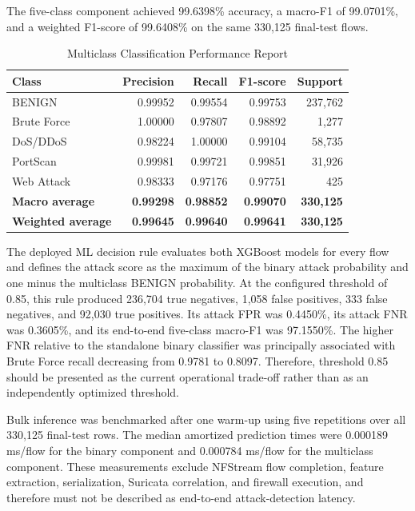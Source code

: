 The five-class component achieved 99.6398\% accuracy, a macro-F1 of
99.0701\%, and a weighted F1-score of 99.6408\% on the same 330,125
final-test flows.

\begin{table}[H]
  \caption{Multiclass Classification Performance Report}
  \centering
  \small
  \begin{tabularx}{\textwidth}{|X|r|r|r|r|}
    \hline
    \textbf{Class} & \textbf{Precision} & \textbf{Recall} & \textbf{F1-score} & \textbf{Support} \\ \hline
    BENIGN & 0.99952 & 0.99554 & 0.99753 & 237,762 \\ \hline
    Brute Force & 1.00000 & 0.97807 & 0.98892 & 1,277 \\ \hline
    DoS/DDoS & 0.98224 & 1.00000 & 0.99104 & 58,735 \\ \hline
    PortScan & 0.99981 & 0.99721 & 0.99851 & 31,926 \\ \hline
    Web Attack & 0.98333 & 0.97176 & 0.97751 & 425 \\ \hline
    \textbf{Macro average} & \textbf{0.99298} & \textbf{0.98852} & \textbf{0.99070} & \textbf{330,125} \\ \hline
    \textbf{Weighted average} & \textbf{0.99645} & \textbf{0.99640} & \textbf{0.99641} & \textbf{330,125} \\ \hline
  \end{tabularx}
\end{table}

The deployed ML decision rule evaluates both XGBoost models for every
flow and defines the attack score as the maximum of the binary attack
probability and one minus the multiclass BENIGN probability. At the
configured threshold of 0.85, this rule produced 236,704 true negatives,
1,058 false positives, 333 false negatives, and 92,030 true positives.
Its attack FPR was 0.4450\%, its attack FNR was 0.3605\%, and its
end-to-end five-class macro-F1 was 97.1550\%. The higher FNR relative to
the standalone binary classifier was principally associated with Brute
Force recall decreasing from 0.9781 to 0.8097. Therefore, threshold 0.85
should be presented as the current operational trade-off rather than as
an independently optimized threshold.

Bulk inference was benchmarked after one warm-up using five repetitions
over all 330,125 final-test rows. The median amortized prediction times
were 0.000189 ms/flow for the binary component and 0.000784 ms/flow for
the multiclass component. These measurements exclude NFStream flow
completion, feature extraction, serialization, Suricata correlation,
and firewall execution, and therefore must not be described as
end-to-end attack-detection latency.

